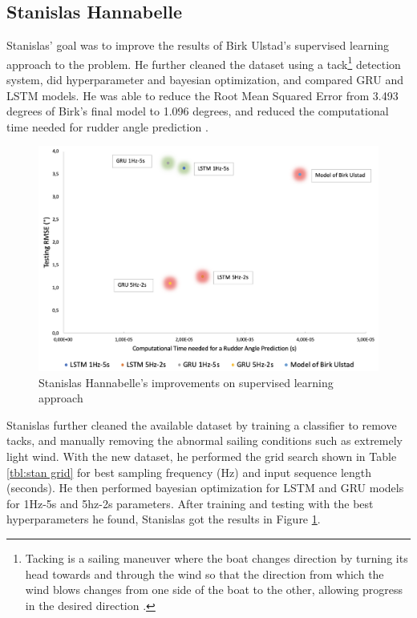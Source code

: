 \documentclass[12pt,twoside]{report}
\begin{document}
\subsection{Stanislas Hannabelle} \label{sec:Stan}
Stanislas' goal was to improve the results of Birk Ulstad's supervised learning approach to the problem. He further cleaned the dataset using a tack\footnote{Tacking is a sailing maneuver where the boat changes direction by turning its head towards and through the wind so that the direction from which the wind blows changes from one side of the boat to the other, allowing progress in the desired direction \cite{wiki:tack}.} detection system, did hyperparameter and bayesian optimization, and compared GRU and LSTM models. He was able to reduce the Root Mean Squared Error from 3.493 degrees of Birk's final model to 1.096 degrees, and reduced the computational time needed for rudder angle prediction \cite{stan}.

\begin{figure}[h]
\centering
\includegraphics[width = 0.9\hsize]{figures/stan results.png}
\caption{Stanislas Hannabelle's improvements on supervised learning approach \cite{stan}}
\label{fig:stan results}
\end{figure}

Stanislas further cleaned the available dataset by training a classifier to remove tacks, and manually removing the abnormal sailing conditions such as extremely light wind. With the new dataset, he performed the grid search shown in Table \ref{tbl:stan grid} for best sampling frequency (Hz) and input sequence length (seconds). He then performed bayesian optimization for LSTM and GRU models for 1Hz-5s and 5hz-2s parameters. After training and testing with the best hyperparameters he found, Stanislas got the results in Figure \ref{fig:stan results}.
\end{document}

